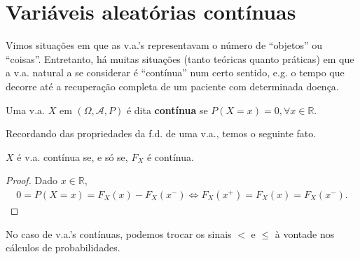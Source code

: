 \documentclass[../Notas.tex]{subfiles}
\begin{document}

\section{Variáveis aleatórias contínuas}
Vimos situações em que as v.a.'s representavam o número de ``objetos'' ou ``coisas''. Entretanto, há muitas situações (tanto teóricas quanto práticas) em que a v.a. natural a se considerar é ``contínua'' num certo sentido, e.g. o tempo que decorre até a recuperação completa de um paciente com determinada doença.

\begin{definition}[V.a. contínua]
Uma v.a. $X$ em $(\Omega, \mathcal{A}, P)$ é dita \textbf{contínua} se $P(X=x) = 0, \forall x\in\mathbb{R}$.
\end{definition}

Recordando das propriedades da f.d. de uma v.a., temos o seguinte fato.

\begin{proposition}
$X$ é v.a. contínua se, e só se, $F_X$ é contínua.
\end{proposition}

\begin{proof}
Dado $x\in\mathbb{R}$,
\begin{align*}
    0 = P(X=x) = F_X(x) - F_X(x^-) \iff F_X(x^+) = F_X(x) = F_X(x^-).
\end{align*}
\end{proof}

No caso de v.a.'s contínuas, podemos trocar os sinais $<$ e $\leq$ à vontade nos cálculos de probabilidades.
\end{document}
